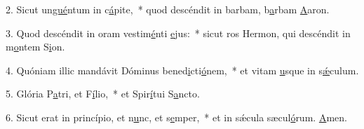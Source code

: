 2. Sicut un\uline{gué}ntum in c\uline{á}pite,~* quod descéndit in barbam, b\uline{a}rbam \uline{A}aron.\par 
3. Quod descéndit in oram vestim\uline{é}nti \uline{e}jus:~* sicut ros Hermon, qui descéndit in m\uline{o}ntem S\uline{i}on.\par 
4. Quóniam illic mandávit Dóminus bened\uline{i}cti\uline{ó}nem,~* et vitam \uline{u}sque in s\uline{ǽ}culum.\par 
5. Glória P\uline{a}tri, et F\uline{í}lio,~* et Spir\uline{í}tui S\uline{a}ncto.\par 
6. Sicut erat in princípio, et n\uline{u}nc, et s\uline{e}mper,~* et in sǽcula sæcul\uline{ó}rum. \uline{A}men.\par 
